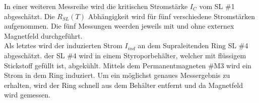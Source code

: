 In einer weiteren Messreihe wird die kritischen Stromstärke $I_C$ vom SL \#1 abgesch\"atzt.
Die $R_{SL}(T)$ Abhängigkeit wird f\"ur fünf verschiedene Stromstärken aufgenommen.
Die f\"unf Messungen weerden jeweils mit und ohne externex Magnetfeld durchgef\"uhrt. \\


Als letztes wird der induzierten Strom $I_{ind}$ an dem Supraleitenden Ring SL \#4 abgesch\"atzt.
der SL \#4 wird in einem Styroporbehälter, welcher mit fl\"ussigem Stickstoff gef\"ullt ist, abgek\"uhlt.
Mittels dem Permanentmagneten \#M3 wird ein Strom in dem Ring induziert.
Um ein m\"oglichst genaues Messergebnis zu erhalten, wird der Ring schnell aus dem Behälter entfernt und da Magnetfeld wird gemessen.